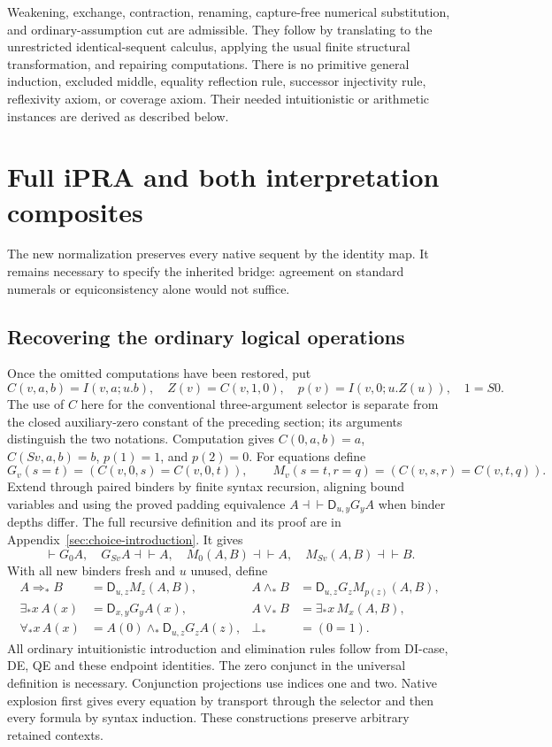 \documentclass[11pt,letterpaper]{article}
\theoremstyle{definition}\newtheorem{definition}[theorem]{Definition}
\theoremstyle{remark}\newtheorem{remark}[theorem]{Remark}
\newcommand{\D}{\mathsf D}
\begin{document}
Weakening, exchange, contraction, renaming, capture-free numerical
substitution, and ordinary-assumption cut are admissible. They follow
by translating to the unrestricted identical-sequent calculus, applying
the usual finite structural transformation, and repairing computations.
There is no primitive general induction, excluded middle, equality
reflection rule, successor injectivity rule, reflexivity axiom, or
coverage axiom. Their needed intuitionistic or arithmetic instances
are derived as described below.



\section{Full iPRA and both interpretation composites}
\label{sec:bridge}

The new normalization preserves every native sequent by the identity
map. It remains necessary to specify the inherited bridge: agreement
on standard numerals or equiconsistency alone would not suffice.

\subsection{Recovering the ordinary logical operations}

Once the omitted computations have been restored, put
\[
 C(v,a,b)=I(v,a;u.b),\quad
 Z(v)=C(v,1,0),\quad p(v)=I(v,0;u.Z(u)),\quad 1=S0.
\]
The use of $C$ here for the conventional three-argument selector is
separate from the closed auxiliary-zero constant of the preceding
section; its arguments distinguish the two notations. Computation gives
$C(0,a,b)=a$, $C(Sv,a,b)=b$, $p(1)=1$, and $p(2)=0$.
For equations define
\[
 G_v(s=t)=(C(v,0,s)=C(v,0,t)),\qquad
 M_v(s=t,r=q)=(C(v,s,r)=C(v,t,q)).
\]
Extend through paired binders by finite syntax recursion, aligning bound
variables and using the proved padding equivalence
$A\dashv\vdash\D_{u,y}G_yA$ when binder depths differ. The full recursive
definition and its proof are in Appendix~\ref{sec:choice-introduction}.
It gives
\[
 \vdash G_0A,\quad G_{Sv}A\dashv\vdash A,\quad
 M_0(A,B)\dashv\vdash A,\quad M_{Sv}(A,B)\dashv\vdash B.
\]
With all new binders fresh and $u$ unused, define
\begin{align*}
 A\Rightarrow_*B&=\D_{u,z}M_z(A,B), &
 A\wedge_*B&=\D_{u,z}G_zM_{p(z)}(A,B),\\
 \exists_*x\,A(x)&=\D_{x,y}G_yA(x), &
 A\vee_*B&=\exists_*x\,M_x(A,B),\\
 \forall_*x\,A(x)&=A(0)\wedge_*\D_{u,z}G_zA(z), &
 \bot_*&=(0=1).
\end{align*}
All ordinary intuitionistic introduction and elimination rules follow
from DI-case, DE, QE and these endpoint identities. The zero conjunct
in the universal definition is necessary. Conjunction projections use
indices one and two. Native explosion first gives every equation by
transport through the selector and then every formula by syntax induction.
These constructions preserve arbitrary retained contexts.
\end{document}
